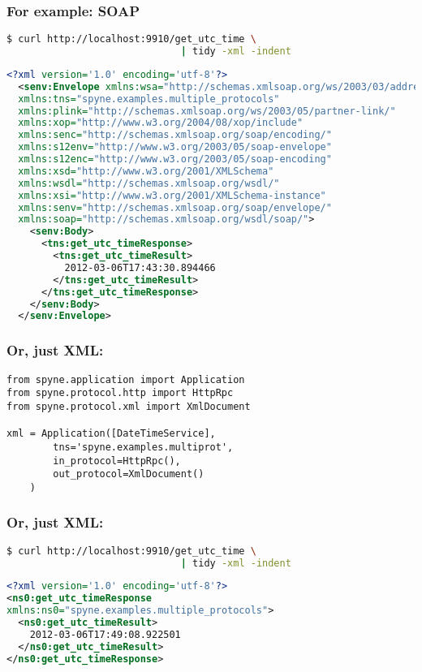 \documentclass{beamer}
\begin{document}
\begin{frame}[fragile]
  \frametitle{For example: SOAP}

  \begin{lstlisting}[language=sh,frame=topline]
$ curl http://localhost:9910/get_utc_time \
                              | tidy -xml -indent
  \end{lstlisting}
  \tiny
  \begin{lstlisting}[language=xml,frame=bottomline]
  <?xml version='1.0' encoding='utf-8'?>
  <senv:Envelope xmlns:wsa="http://schemas.xmlsoap.org/ws/2003/03/addressing"
  xmlns:tns="spyne.examples.multiple_protocols"
  xmlns:plink="http://schemas.xmlsoap.org/ws/2003/05/partner-link/"
  xmlns:xop="http://www.w3.org/2004/08/xop/include"
  xmlns:senc="http://schemas.xmlsoap.org/soap/encoding/"
  xmlns:s12env="http://www.w3.org/2003/05/soap-envelope"
  xmlns:s12enc="http://www.w3.org/2003/05/soap-encoding"
  xmlns:xsd="http://www.w3.org/2001/XMLSchema"
  xmlns:wsdl="http://schemas.xmlsoap.org/wsdl/"
  xmlns:xsi="http://www.w3.org/2001/XMLSchema-instance"
  xmlns:senv="http://schemas.xmlsoap.org/soap/envelope/"
  xmlns:soap="http://schemas.xmlsoap.org/wsdl/soap/">
    <senv:Body>
      <tns:get_utc_timeResponse>
        <tns:get_utc_timeResult>
          2012-03-06T17:43:30.894466
        </tns:get_utc_timeResult>
      </tns:get_utc_timeResponse>
    </senv:Body>
  </senv:Envelope>
  \end{lstlisting}
\end{frame}

\begin{frame}[fragile]
  \frametitle{Or, just XML:}

  \begin{lstlisting}
from spyne.application import Application
from spyne.protocol.http import HttpRpc
from spyne.protocol.xml import XmlDocument

xml = Application([DateTimeService],
        tns='spyne.examples.multiprot',
        in_protocol=HttpRpc(),
        out_protocol=XmlDocument()
    )
  \end{lstlisting}
\end{frame}


\begin{frame}[fragile]
  \frametitle{Or, just XML:}

  \begin{lstlisting}[language=sh,frame=topline]
$ curl http://localhost:9910/get_utc_time \
                              | tidy -xml -indent
  \end{lstlisting}
  \small
  \begin{lstlisting}[language=xml,frame=bottomline]
<?xml version='1.0' encoding='utf-8'?>
<ns0:get_utc_timeResponse
xmlns:ns0="spyne.examples.multiple_protocols">
  <ns0:get_utc_timeResult>
    2012-03-06T17:49:08.922501
  </ns0:get_utc_timeResult>
</ns0:get_utc_timeResponse>
  \end{lstlisting}
\end{frame}
\end{document}
